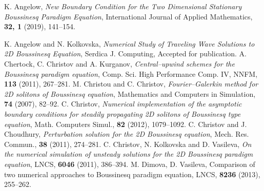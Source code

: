 \documentclass{article}
\begin{document}
\begin{thebibliography}{99}

K. Angelow, 
\emph{New Boundary Condition for the Two Dimensional Stationary Boussinesq Paradigm Equation},
International Journal of Applied Mathematics, \textbf{32, 1} (2019), 141--154.

K. Angelow and N. Kolkovska, 
\emph{Numerical Study of Traveling Wave Solutions to 2D Boussinesq Equation},
Serdica J. Computing,  Accepted for publication.
%
A. Chertock, C. Christov and A. Kurganov, 
\emph{Central--upwind schemes for the  Boussinesq paradigm equation},
Comp. Sci. High Performance Comp. IV, NNFM, \textbf{113} (2011), 267--281.
%
%
M. Christou and C. Christov, 
\emph{Fourier–Galerkin method for 2D solitons of Boussinesq equation}, 
Mathematics and Computers in Simulation, \textbf{74} (2007), 82--92.
%
%
C. Christov, 
\emph{Numerical implementation of the asymptotic boundary conditions
for steadily propagating 2D solitons of Boussinesq type equation},       
Math. Computers  Simul., \textbf{82} (2012),  1079--1092.
%
C. Christov and J. Choudhury, 
\emph{Perturbation solution  for the 2D Boussinesq equation},       
Mech. Res. Commun., \textbf{38} (2011),  274--281.
%
C. Christov, N. Kolkovska and D. Vasileva, 
\emph{On the numerical simulation of unsteady solutions for the 2D Boussinesq paradigm equation},
LNCS, \textbf{6046} (2011), 386--394.
%
M. Dimova, D. Vasileva, Comparison of two numerical approaches to
Boussinesq paradigm equation, LNCS, \textbf{8236} 
(2013), 255--262.

%
%



\end{thebibliography}
\end{document}
